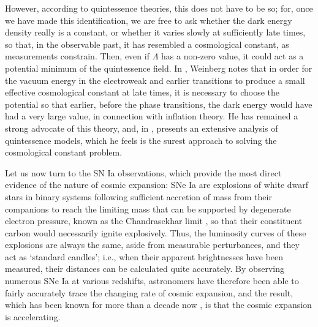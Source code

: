 However, according to quintessence theories, this does not have to be so; for, once we have made this identification, we are free to ask whether the dark energy density really is a constant, or whether it varies slowly at sufficiently late times, so that, in the observable past, it has resembled a cosmological constant, as measurements constrain. Then, even if $\Lambda$ has a non-zero value, it could act as a potential minimum of the quintessence field. In \cite{Weinberg1989}, Weinberg notes that in order for the vacuum energy in the electroweak and earlier transitions to produce a small effective cosmological constant at late times, it is necessary to choose the potential so that earlier, before the phase transitions, the dark energy would have had a very large value, in connection with inflation theory. He has remained a strong advocate of this theory, and, in \cite{Weinberg2008}, presents an extensive analysis of quintessence models, which he feels is the surest approach to solving the cosmological constant problem.

Let us now turn to the SN Ia observations, which provide the most direct evidence of the nature of cosmic expansion: SNe Ia are explosions of white dwarf stars in binary systems following sufficient accretion of mass from their companions to reach the limiting mass that can be supported by degenerate electron pressure, known as the Chandrasekhar limit \cite{Chandrasekhar1931a,Chandrasekhar1935}, so that their constituent carbon would necessarily ignite explosively. Thus, the luminosity curves of these explosions are always the same, aside from measurable perturbances, and they act as `standard candles'; i.e., when their apparent brightnesses have been measured, their distances can be calculated quite accurately. By observing numerous SNe Ia at various redshifts, astronomers have therefore been able to fairly accurately trace the changing rate of cosmic expansion, and the result, which has been known for more than a decade now \cite{Riess1998,Perlmutter1999}, is that the cosmic expansion is accelerating.


